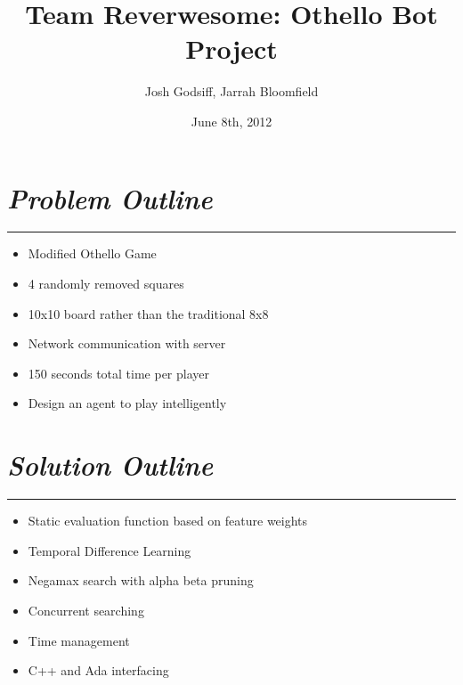\documentclass[10pt]{report}
\begin{document}
\date{June 8th, 2012}
\title{Team Reverwesome: Othello Bot Project}
\author{Josh Godsiff, Jarrah Bloomfield}
\maketitle

\section*{\emph{Problem Outline}}
\hrule
    \begin{itemize}
  \item
    Modified Othello Game
  \item
    4 randomly removed squares
  \item
    10x10 board rather than the traditional 8x8
  \item
    Network communication with server
  \item
    150 seconds total time per player
  \item
    Design an agent to play intelligently
  \end{itemize}

\section*{\emph{Solution Outline}}
\hrule
    \begin{itemize}
  \item
    Static evaluation function based on feature weights
  \item
    Temporal Difference Learning
  \item
    Negamax search with alpha beta pruning
  \item
    Concurrent searching
  \item
    Time management
  \item
    C++ and Ada interfacing
  \end{itemize}
\end{document}
